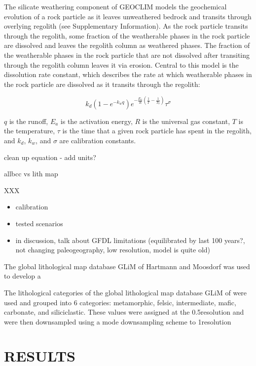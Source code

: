 \documentclass[11pt,letterpaper]{article}
\begin{document}
The silicate weathering component of GEOCLIM models the geochemical evolution of a rock particle as it leaves unweathered bedrock and transits through overlying regolith (see Supplementary Information). As the rock particle transits through the regolith, some fraction of the weatherable phases in the rock particle are dissolved and leaves the regolith column as weathered phases. The fraction of the weatherable phases in the rock particle that are not dissolved after transiting through the regolith column leaves it via erosion. Central to this model is the dissolution rate constant, which describes the rate at which weatherable phases in the rock particle are dissolved as it transits through the regolith:

\begin{equation}
    k_{d}\left(1-e^{-k_{w}q}\right)e^{-\frac{E_{a}}{R}\left(\frac{1}{T}-\frac{1}{T_{0}}\right)}\tau^{\sigma}
    \label{eq:1}
\end{equation}

$q$ is the runoff, $E_{a}$ is the activation energy, $R$ is the universal gas constant, $T$ is the temperature, $\tau$ is the time that a given rock particle has spent in the regolith, and $k_{d}$, $k_{w}$, and $\sigma$ are calibration constants.



clean up equation - add units?

allbcc vs lith map

XXX


\begin{itemize}
    \item calibration
    \item tested scenarios
    \item in discussion, talk about GFDL limitations (equilibrated by last 100 years?, not changing paleogeography, low resolution, model is quite old)
\end{itemize}

The global lithological map database GLiM of Hartmann and Moosdorf was used to develop a

The lithological categories of the global lithological map database GLiM of \cite{Hartmann2012a} were used and grouped into 6 categories: metamorphic, felsic, intermediate, mafic, carbonate, and siliciclastic. These values were assigned at the 0.5\textdegree resolution and were then downsampled using a mode downsampling scheme to 1\textdegree resolution

\section*{RESULTS}
\end{document}
